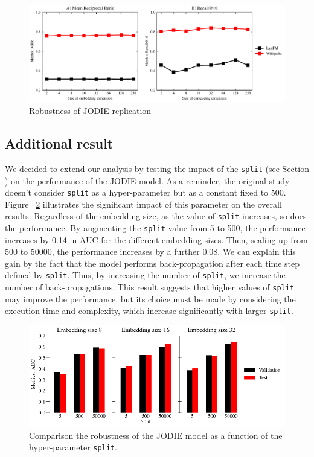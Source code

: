 \begin{figure}[htbp]
    \centering
    \includegraphics[width = \textwidth]{image/lastFM-wiki.pdf}
    \caption{Robustness of JODIE replication}
    \label{emb-size}
\end{figure}

\subsection{Additional result}
We decided to extend our analysis by testing the impact of the \texttt{split} (see Section ) on the performance of the JODIE model. As a reminder, the original study doesn't consider \texttt{split} as a hyper-parameter but as a constant fixed to 500. 
Figure ~\ref{split} illustrates the significant impact of this parameter on the overall results. Regardless of the embedding size, as the value of \texttt{split} increases, so does the performance. By augmenting the \texttt{split} value from 5 to 500, the performance increases by 0.14 in AUC for the different embedding sizes. Then, scaling up from 500 to 50000, the performance increases by a further 0.08. We can explain this gain by the fact that the model performs back-propagation after each time step defined by \texttt{split}. Thus, by increasing the number of \texttt{split}, we increase the number of back-propagations. This result suggests that higher values of \texttt{split} may improve the performance, but its choice must be made by considering the execution time and complexity, which increase significantly with larger \texttt{split}.

\begin{figure}[htbp]
    \centering
    \includegraphics[width = \textwidth]{image/split.pdf}
    \caption{Comparison the robustness of the JODIE model as a function of the hyper-parameter \texttt{split}.}
    \label{split}
\end{figure}

